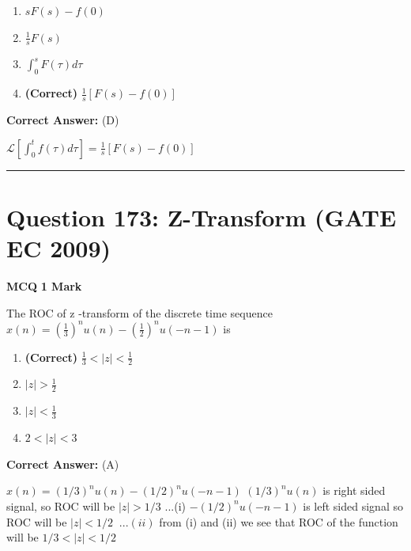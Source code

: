 \documentclass[11pt,a4paper]{article}
\begin{document}
\begin{enumerate}[label=(\Alph*)]
    \item $sF(s) - f (0)$
    \item $\frac{1}{s}F(s)$
    \item $\int_{0}^{s}F(\tau )d\tau$
    \item \textbf{(Correct)} $\frac{1}{s}[F(s)-f(0)]$
\end{enumerate}

\noindent \textbf{Correct Answer:} (D)

\begin{tcolorbox}[solbox, title=Detailed Solution -- Question 172]
$\mathcal{L}\left[\int_{0}^{t} f(\tau) d \tau\right]=\frac{1}{s}[F(s)-f(0)]$
\end{tcolorbox}

\vspace{1.5em}
\hrule
\vspace{1.5em}

\section*{Question 173: Z-Transform (GATE EC 2009)}
\noindent \textbf{\color{primary}MCQ} \hfill \textbf{\color{secondary}1 Mark}


\noindent The ROC of z -transform of the discrete time sequence $x(n)=(\frac{1}{3})^{n}u(n)-(\frac{1}{2})^{n}u(-n-1)$ is


\begin{enumerate}[label=(\Alph*)]
    \item \textbf{(Correct)} $\frac{1}{3} < |z| < \frac{1}{2}$
    \item $|z|> \frac{1}{2}$
    \item $|z| < \frac{1}{3}$
    \item $2 < |z| < 3$
\end{enumerate}

\noindent \textbf{Correct Answer:} (A)

\begin{tcolorbox}[solbox, title=Detailed Solution -- Question 173]
$x(n)=(1 / 3)^{n} u(n)-(1 / 2)^{n} u(-n-1)$
$(1 / 3)^{n} u(n)$ is right sided signal, so ROC will be
$|z| > 1 / 3$\;\; ...(i)
$-(1 / 2)^{n} u(-n-1)$ is left sided signal so ROC will be
$|z| < 1 / 2 \; \; ...(ii)$
 from (i) and (ii) we see that ROC of the function will be
$1 / 3 < |z| < 1 / 2$
\end{tcolorbox}
\end{document}
